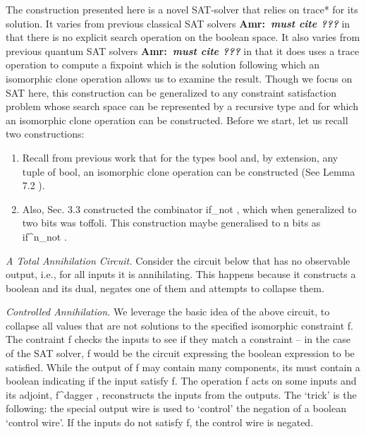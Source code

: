 \documentclass[preprint]{sigplanconf}
\newcommand{\xcomment}[2]{\textbf{#1:~\textsl{#2}}}
\newcommand{\amr}[1]{\xcomment{Amr}{#1}}
\begin{document}

The construction presented here is a novel SAT-solver that relies on
{{trace*}} for its solution. It varies from previous classical SAT solvers
\amr{must cite ???} in that there is no explicit search operation on the
boolean space. It also varies from previous quantum SAT solvers \amr{must
  cite ???} in that it does uses a {{trace}} operation to compute a fixpoint
which is the solution following which an isomorphic clone operation allows us
to examine the result.  Though we focus on SAT here, this construction can be
generalized to any constraint satisfaction problem whose search space can be
represented by a recursive type and for which an isomorphic clone operation
can be constructed. Before we start, let us recall two constructions:

\begin{enumerate}
\item Recall from previous work that for the types {{bool}} and, by
  extension, any tuple of {{bool}}, an isomorphic clone operation can
  be constructed (See Lemma 7.2 \cite{infeffects}).

\item Also, Sec. 3.3 \cite{infeffects} constructed the combinator
  {{if_{not} }}, which when generalized to two bits was
  {{toffoli}}. This construction maybe generalised to {{n}} bits as
  {{if^n_{not} }}.
\end{enumerate}


\emph{A Total Annihilation Circuit.}  Consider the circuit below that
has no observable output, i.e., for all inputs it is
annihilating. This happens because it constructs a boolean and its
dual, negates one of them and attempts to collapse them.

\begin{center}
\end{center}

\emph{Controlled Annihilation.}
We leverage the basic idea of the above circuit, to collapse all
values that are not solutions to the specified isomorphic constraint
{{f}}. The contraint {{f}} checks the inputs to see if they match a
constraint -- in the case of the SAT solver, {{f}} would be the
circuit expressing the boolean expression to be satisfied.  While the
output of {{f}} may contain many components, its must contain a
boolean indicating if the input satisfy {{f}}. The operation {{f}}
acts on some inputs and its adjoint, {{f^{dagger} }}, reconstructs the
inputs from the outputs.  The `trick' is the following: the special
output wire is used to `control' the negation of a boolean `control
wire'.  If the inputs do not satisfy {{f}}, the control wire is
negated.
\end{document}
